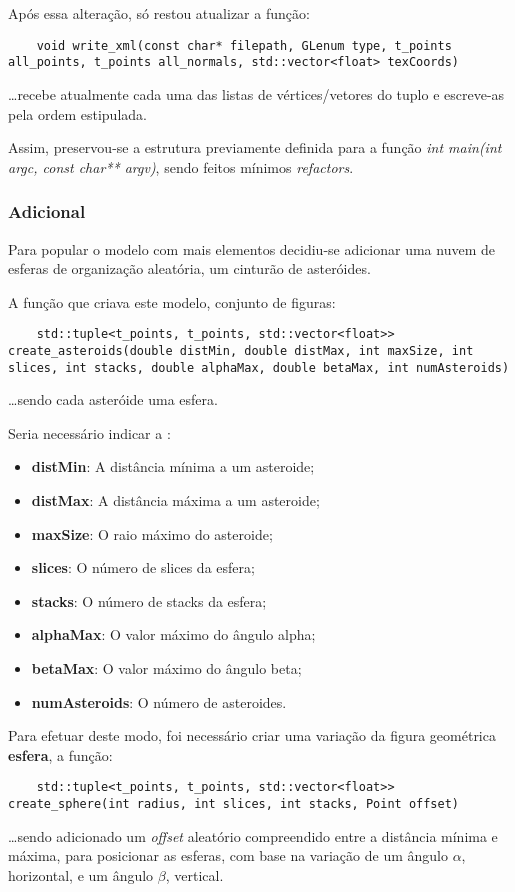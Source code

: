 \documentclass[relatorio.tex]{subfiles}
\begin{document}
Após essa alteração, só restou atualizar a função:
\begin{verbatim}
    void write_xml(const char* filepath, GLenum type, t_points all_points, t_points all_normals, std::vector<float> texCoords)
\end{verbatim}
\dots recebe atualmente cada uma das listas de vértices/vetores 
do tuplo e escreve-as pela ordem estipulada.

Assim, preservou-se a estrutura previamente definida 
para a função \textit{int main(int argc, const char** argv)},
sendo feitos mínimos \textit{refactors}.

\subsubsection{Adicional} \label{subsec:aster}

Para popular o modelo com mais elementos decidiu-se 
adicionar uma nuvem de esferas de organização aleatória,
um cinturão de asteróides. 

A função que criava este modelo, conjunto de figuras:
\begin{verbatim}
    std::tuple<t_points, t_points, std::vector<float>> create_asteroids(double distMin, double distMax, int maxSize, int slices, int stacks, double alphaMax, double betaMax, int numAsteroids)
\end{verbatim}
\dots sendo cada asteróide uma esfera.

Seria necessário indicar a :
\begin{itemize}
    \item \textbf{distMin}: A distância mínima a um asteroide;
    \item \textbf{distMax}: A distância máxima a um asteroide;
    \item \textbf{maxSize}: O raio máximo do asteroide;
    \item \textbf{slices}: O número de slices da esfera;
    \item \textbf{stacks}: O número de stacks da esfera;
    \item \textbf{alphaMax}: O valor máximo do ângulo alpha;
    \item \textbf{betaMax}: O valor máximo do ângulo beta;
    \item \textbf{numAsteroids}: O número de asteroides.
\end{itemize}

Para efetuar deste modo, foi necessário criar uma variação 
da figura geométrica \textbf{esfera}, a função:

\begin{verbatim}
    std::tuple<t_points, t_points, std::vector<float>> create_sphere(int radius, int slices, int stacks, Point offset)
\end{verbatim}
\dots sendo adicionado um \textit{offset} aleatório compreendido
entre a distância mínima e máxima, para posicionar as esferas,
com base na variação de um ângulo $\alpha$, horizontal,
e um ângulo $\beta$, vertical.
\end{document}
